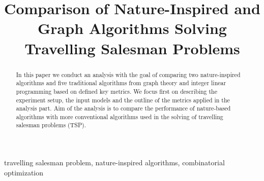 \documentclass[conference]{IEEEtran}
\begin{document}
	
	\title{Comparison of Nature-Inspired and Graph Algorithms Solving Travelling Salesman Problems}
	
	\author{
		\and
	}
	
	\maketitle
	
	\begin{abstract}
		In this paper we conduct an analysis with the goal of comparing two nature-inspired algorithms and five traditional algorithms from graph theory and integer linear programming based on defined key metrics. We focus first on describing the experiment setup, the input models and the outline of the metrics applied in the analysis part. Aim of the analysis is to compare the performance of nature-based algorithms with more conventional algorithms used in the solving of travelling salesman problems (TSP).\\
	\end{abstract}
	
	\begin{IEEEkeywords}
		travelling salesman problem, nature-inspired algorithms, combinatorial optimization
	\end{IEEEkeywords}
\end{document}
